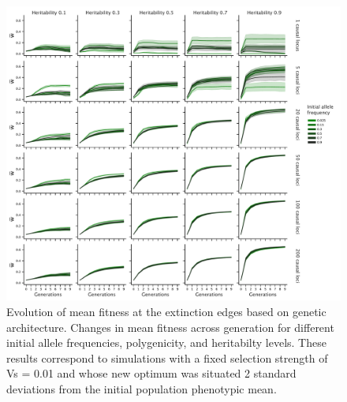 \documentclass{article}
\begin{document}
\begin{figure}[H]
    \centering
    \includegraphics[width=1\textwidth]{figures/mean_fitness_acrossgen.pdf}
    \caption{Evolution of mean fitness at the extinction edges based on genetic architecture. Changes in mean fitness across generation for different initial allele frequencies, polygenicity, and heritabilty levels. These results correspond to simulations with a fixed selection strength of Vs = 0.01 and whose new optimum was situated 2 standard deviations from the initial population phenotypic mean.}
    \label{fig:mean_fitness_acrossgen}
\end{figure}
\end{document}

